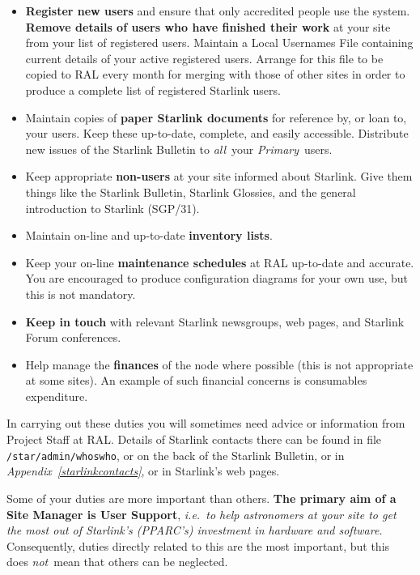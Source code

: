 \documentclass[twoside,11pt]{article}
\newcommand{\xref}[3]{#1}
\begin{document}
\begin{itemize}
\item {\bf Register new users} and ensure that only accredited people use the
system.
{\bf Remove details of users who have finished their work} at your site from
your list of registered users.
Maintain a Local Usernames File containing current details of your active
registered users.
Arrange for this file to be copied to RAL every month for merging with those of
other sites in order to produce a complete list of registered Starlink users.

\item Maintain copies of {\bf paper Starlink documents} for reference by, or
loan to, your users.
Keep these up-to-date, complete, and easily accessible.
Distribute new issues of the Starlink Bulletin to {\em all}\, your
{\em Primary}\, users.

\item Keep appropriate {\bf non-users} at your site informed about Starlink.
Give them things like the Starlink Bulletin, Starlink Glossies, and the
general introduction to Starlink
(\xref{SGP/31}{sgp31}{}).

\item Maintain on-line and up-to-date {\bf inventory lists}.

\item Keep your on-line {\bf maintenance schedules} at RAL up-to-date and
accurate.
You are encouraged to produce configuration diagrams for your own use,
but this is not mandatory.

\item {\bf Keep in touch} with relevant Starlink newsgroups, web pages, and
Starlink Forum conferences.

\item Help manage the {\bf finances} of the node where possible (this is not
appropriate at some sites).
An example of such financial concerns is consumables expenditure.

\end{itemize}

In carrying out these duties you will sometimes need advice or information
from Project Staff at RAL.
Details of Starlink contacts there can be found in file
{\tt /star/admin/whoswho}, or on the back of the Starlink Bulletin, or in
{\em Appendix~\ref{starlinkcontacts}},
or in Starlink's web pages.

Some of your duties are more important than others.
{\bf The primary aim of a Site Manager is User Support}, {\em i.e.\ to
help astronomers at your site to get the most out of Starlink's (PPARC's)
investment in hardware and software.}
Consequently, duties directly related to this are the most important, but this
does {\em not}\, mean that others can be neglected.
\end{document}
